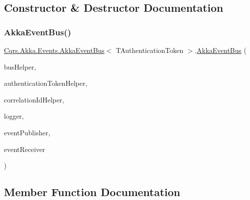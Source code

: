 \subsection{Constructor \& Destructor Documentation}
\mbox{\label{classCqrs_1_1Akka_1_1Events_1_1AkkaEventBus_ab1f292c21b5516a89fdcc019deb04063}} 
\subsubsection{\texorpdfstring{Akka\+Event\+Bus()}{AkkaEventBus()}}
{\footnotesize\ttfamily \hyperlink{classCqrs_1_1Akka_1_1Events_1_1AkkaEventBus}{Cqrs.\+Akka.\+Events.\+Akka\+Event\+Bus}$<$ T\+Authentication\+Token $>$.\hyperlink{classCqrs_1_1Akka_1_1Events_1_1AkkaEventBus}{Akka\+Event\+Bus} (\begin{DoxyParamCaption}\item[{\hyperlink{interfaceCqrs_1_1Bus_1_1IBusHelper}{I\+Bus\+Helper}}]{bus\+Helper,  }\item[{\hyperlink{interfaceCqrs_1_1Authentication_1_1IAuthenticationTokenHelper}{I\+Authentication\+Token\+Helper}$<$ T\+Authentication\+Token $>$}]{authentication\+Token\+Helper,  }\item[{I\+Correlation\+Id\+Helper}]{correlation\+Id\+Helper,  }\item[{I\+Logger}]{logger,  }\item[{\hyperlink{interfaceCqrs_1_1Events_1_1IEventPublisher}{I\+Event\+Publisher}$<$ T\+Authentication\+Token $>$}]{event\+Publisher,  }\item[{\hyperlink{interfaceCqrs_1_1Events_1_1IEventReceiver}{I\+Event\+Receiver}$<$ T\+Authentication\+Token $>$}]{event\+Receiver }\end{DoxyParamCaption})}



\subsection{Member Function Documentation}
\mbox{\label{classCqrs_1_1Akka_1_1Events_1_1AkkaEventBus_a1a89590afc6970f00fe055961a6773e8}} 
